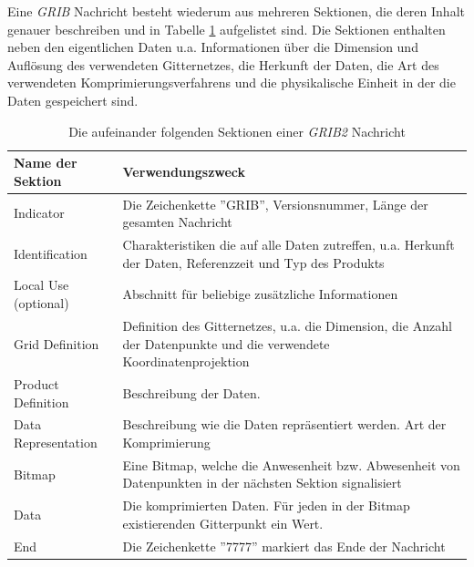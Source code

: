 Eine \textit{GRIB} Nachricht besteht wiederum aus mehreren Sektionen,
die deren Inhalt genauer beschreiben und in Tabelle \ref{tab:grib}
aufgelistet sind. Die Sektionen enthalten neben den eigentlichen Daten
u.a. Informationen über die Dimension und Auflösung des verwendeten
Gitternetzes, die Herkunft der Daten, die Art des verwendeten
Komprimierungsverfahrens und die physikalische Einheit in der die
Daten gespeichert sind.

\begin{table}
  \centering
  {\sf
    \footnotesize
    \begin{longtable}{@{}lp{10cm}@{}}

      \toprule
      \textbf{Name der Sektion} & \textbf{Verwendungszweck} \\

      \midrule

      Indicator & Die Zeichenkette ''GRIB'', Versionsnummer, Länge der gesamten Nachricht \\

      Identification & Charakteristiken die auf alle Daten zutreffen, u.a. Herkunft der Daten, Referenzzeit und Typ des Produkts \\

      Local Use (optional) & Abschnitt für beliebige zusätzliche Informationen \\

      Grid Definition &  Definition des Gitternetzes, u.a. die Dimension, die Anzahl der Datenpunkte und die verwendete Koordinatenprojektion \\

      Product Definition &  Beschreibung der Daten. \\

      Data Representation &  Beschreibung wie die Daten repräsentiert werden. Art der Komprimierung \\

      Bitmap & Eine Bitmap, welche die Anwesenheit bzw. Abwesenheit von Datenpunkten in der nächsten Sektion signalisiert \\

      Data &  Die komprimierten Daten. Für jeden in der Bitmap existierenden Gitterpunkt ein Wert. \\

      End & Die Zeichenkette ''7777'' markiert das Ende der Nachricht \\

      \bottomrule

    \end{longtable}
  }

  \caption{Die aufeinander folgenden Sektionen einer \textit{GRIB2} Nachricht}
  \label{tab:grib}

\end{table}

